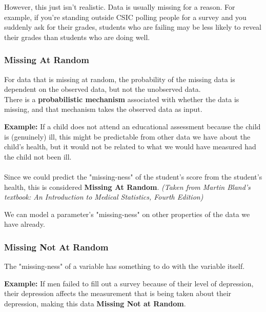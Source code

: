 \documentclass[english, 10pt]{article}
\begin{document}
\hfill \break However, this just isn't realistic. Data is usually missing for a reason. For example, if you're standing outside CSIC polling people for a survey and you suddenly ask for their grades, students who are failing may be less likely to reveal their grades than students who are doing well.

\subsubsection{Missing At Random}

For data that is missing at random, the probability of the missing data is dependent on the observed data, but not the unobserved data.\\

There is a \textbf{probabilistic mechanism} associated with whether the data is missing, and that mechanism takes the observed data as input.\\

\begin{myproof}
\textbf{Example:} If a child does not attend an educational assessment because the child is (genuinely) ill, this might be predictable from other data we have about the child's health, but it would not be related to what we would have measured had the child not been ill.\\\\ Since we could predict the "missing-ness" of the student's score from the student's health, this is considered \textbf{Missing At Random}. \textit{(Taken from Martin Bland's textbook: An Introduction to Medical Statistics, Fourth Edition)}
\end{myproof}

\hfill \break We can model a parameter's "missing-ness" on other properties of the data we have already.

\subsubsection{Missing Not At Random}

The "missing-ness" of a variable has something to do with the variable itself.

\begin{myproof}
\textbf{Example:} If men failed to fill out a survey because of their level of depression, their depression affects the measurement that is being taken about their depression, making this data \textbf{Missing Not at Random}.
\end{myproof}
\end{document}
